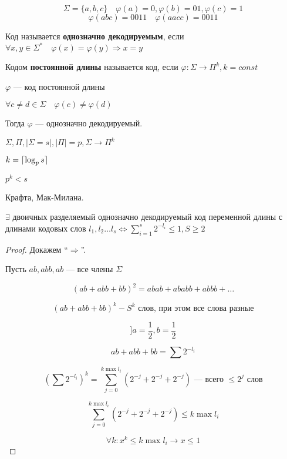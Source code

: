 \begin{example}
    $$\Sigma=\{a,b,c\} \quad \varphi(a)=0, \varphi(b)=01, \varphi(c)=1$$
    $$\varphi(abc)=0011 \quad \varphi(aacc)=0011$$
\end{example}

\begin{definition}
    Код называется \textbf{однозначно декодируемым}, если $\forall x,y\in\Sigma^* \quad \varphi(x)=\varphi(y) \Rightarrow x=y$
\end{definition}

\begin{definition}
    Кодом \textbf{постоянной длины} называется код, если $\varphi: \Sigma\to\Pi^k, k=const$
\end{definition}

\begin{lemma}
    $\varphi$ --- код постоянной длины

    $\forall c\not=d\in\Sigma \quad \varphi(c)\not=\varphi(d)$

    Тогда $\varphi$ --- однозначно декодируемый.
\end{lemma}

\begin{theorem}
    $\Sigma, \Pi, |\Sigma=s|, |\Pi|=p, \Sigma\to \Pi^k$
    
    $k=\lceil\log_p s\rceil$

    $p^k<s$
\end{theorem}

\begin{theorem}
    Крафта, Мак-Милана.

    $\exists$ двоичных разделяемый однозначно декодируемый код переменной длины с длинами кодовых слов $l_1,l_2\ldots l_s\Leftrightarrow\sum_{i=1}^s 2^{-l_i}\leq 1, S\geq 2$
\end{theorem}

\begin{proof}
    Докажем ``$\Rightarrow$''.

    Пусть $ab, abb, ab$ --- все члены $\Sigma$

    $$(ab+abb+bb)^2=abab+ababb+abbb+\ldots$$

    $$(ab+abb+bb)^k - S^k \text{ слов, при этом все слова разные} $$
    
    $$]a=\frac{1}{2}, b=\frac{1}{2}$$

    $$ab+abb+bb=\sum 2^{-l_i}$$

    $$(\sum 2^{-l_i})^k=\sum_{j=0}^{k\max l_i}(2^{-j}+2^{-j}+2^{-j}) \text{ --- всего $\leq 2^j$ слов}$$

    $$\sum_{j=0}^{k\max l_i}(2^{-j}+2^{-j}+2^{-j})\leq k\max l_i$$

    $$\forall k: x^k\leq k\max l_i \to x\leq 1$$
\end{proof}

